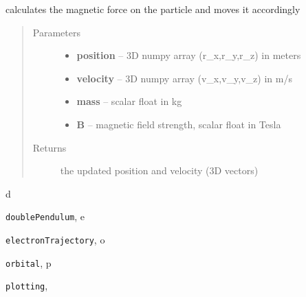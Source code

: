 \documentclass[letterpaper,10pt,english]{sphinxmanual}
\begin{document}
\begin{fulllineitems}
\label{index:electronTrajectory.update_pos}
calculates the magnetic force on the particle and moves it
accordingly
\begin{quote}\begin{description}
\item[{Parameters}] \leavevmode\begin{itemize}
\item {} 
\textbf{position} -- 3D numpy array (r\_x,r\_y,r\_z) in meters

\item {} 
\textbf{velocity} -- 3D numpy array (v\_x,v\_y,v\_z) in m/s

\item {} 
\textbf{mass} -- scalar float in kg

\item {} 
\textbf{B} -- magnetic field strength, scalar float in Tesla

\end{itemize}

\item[{Returns}] \leavevmode
the updated position and velocity (3D vectors)

\end{description}\end{quote}

\end{fulllineitems}



\renewcommand{\indexname}{Python Module Index}
\begin{theindex}
\def\bigletter#1{{\Large\sffamily#1}\nopagebreak\vspace{1mm}}
\bigletter{d}
\item {\texttt{doublePendulum}}, \pageref{index:module-doublePendulum}
\indexspace
\bigletter{e}
\item {\texttt{electronTrajectory}}, \pageref{index:module-electronTrajectory}
\indexspace
\bigletter{o}
\item {\texttt{orbital}}, \pageref{index:module-orbital}
\indexspace
\bigletter{p}
\item {\texttt{plotting}}, \pageref{index:module-plotting}
\end{theindex}

\renewcommand{\indexname}{Index}
\printindex
\end{document}
